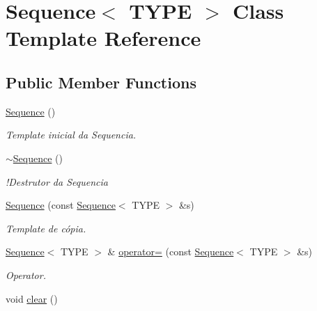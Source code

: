 \hypertarget{classSequence}{}\section{Sequence$<$ T\+Y\+P\+E $>$ Class Template Reference}
\label{classSequence}
\subsection*{Public Member Functions}
\begin{DoxyCompactItemize}
\item 
\hyperlink{classSequence_a69865d17cd69ba765a6cb034be7539b9}{Sequence} ()
\begin{DoxyCompactList}\small\item\em Template inicial da Sequencia. \end{DoxyCompactList}\item 
\hyperlink{classSequence_ace9aa11de35439018052db2efb8a7369}{$\sim$\+Sequence} ()
\begin{DoxyCompactList}\small\item\em !\+Destrutor da Sequencia \end{DoxyCompactList}\item 
\hyperlink{classSequence_a73d0aa763847bbaa3b2d4eca62abc8f7}{Sequence} (const \hyperlink{classSequence}{Sequence}$<$ T\+Y\+P\+E $>$ \&s)
\begin{DoxyCompactList}\small\item\em Template de cópia. \end{DoxyCompactList}\item 
\hyperlink{classSequence}{Sequence}$<$ T\+Y\+P\+E $>$ \& \hyperlink{classSequence_a59a572a692c450cc96554a914a2e585c}{operator=} (const \hyperlink{classSequence}{Sequence}$<$ T\+Y\+P\+E $>$ \&s)
\begin{DoxyCompactList}\small\item\em Operator. \end{DoxyCompactList}\item 
\hypertarget{classSequence_ac54501594eaa05f1f5f3859fb3af249c}{}void \hyperlink{classSequence_ac54501594eaa05f1f5f3859fb3af249c}{clear} ()\label{classSequence_ac54501594eaa05f1f5f3859fb3af249c}


\end{DoxyCompactItemize}
